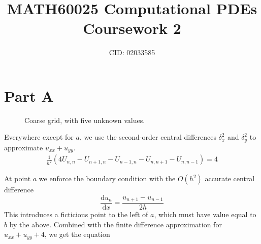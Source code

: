 \documentclass{article}
\title{MATH60025 Computational PDEs Coursework 2}
\author{
CID: 02033585
}
\date{}
\numberwithin{equation}{section}
\theoremstyle{definition}
\newcommand{\dd}[2]{\frac{\mathrm{d} #1}{\mathrm{d} #2}}
\begin{document}
\maketitle

\section{Part A}


\begin{figure}[H]
    \centering
    \caption{Coarse grid, with five unknown values.}
    \label{fig:grid}
\end{figure}


Everywhere except for $a$, we use the second-order central differences $\delta^2_x$ and $\delta^2_y$ to approximate $u_{xx} + u_{yy}$.
\begin{align}
    \frac{1}{h^2} \left(
        4U_{n,n} - U_{n+1, n} - U_{n-1, n} - U_{n, n+1} - U_{n, n-1}
    \right)
    = 4
\end{align}

At point $a$ we enforce the boundary condition with the $O(h^2)$ accurate central difference
\begin{equation}
    \dd{u_{n}}{x}=\frac{u_{n+1}-u_{n-1}}{2h}
\end{equation}
This introduces a ficticious point to the left of $a$, which must have value equal to $b$ by the above. Combined with the finite difference approximation for $u_{xx} + u_{yy} + 4$, we get the equation
\end{document}
